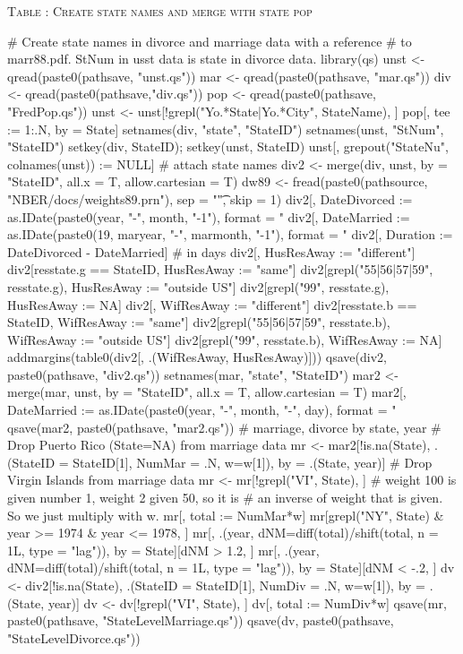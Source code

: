 \begin{appendix}
\clearpage
\textsc{Table \thetable: Create state names and merge with state pop}
\begin{Schunk}
\begin{Sinput}
# Create state names in divorce and marriage data with a reference 
# to marr88.pdf. \textsf{StNum} in usst data is \textsf{state} in divorce data.
library(qs)
unst <- qread(paste0(pathsave, "unst.qs"))
mar <- qread(paste0(pathsave, "mar.qs"))
div <- qread(paste0(pathsave,"div.qs"))
pop <- qread(paste0(pathsave, "FredPop.qs"))
unst <- unst[!grepl("Yo.*State|Yo.*City", StateName), ]
pop[, tee := 1:.N, by = State]
setnames(div, "state", "StateID")
setnames(unst, "StNum", "StateID")
setkey(div, StateID); setkey(unst, StateID)
unst[, grepout("StateNu", colnames(unst)) := NULL]
# attach state names
div2 <- merge(div, unst, by = "StateID", all.x = T, allow.cartesian = T)
dw89 <- fread(paste0(pathsource, "NBER/docs/weights89.prn"), 
  sep = "\t", skip = 1)
div2[, DateDivorced := 
  as.IDate(paste0(year, "-", month, "-1"), format = "%Y-%m-%d")]
div2[, DateMarried := 
  as.IDate(paste0(19, maryear, "-", marmonth, "-1"), format = "%Y-%m-%d")]
div2[, Duration := DateDivorced - DateMarried] # in days
div2[, HusResAway := "different"]
div2[resstate.g == StateID, HusResAway := "same"]
div2[grepl("55|56|57|59", resstate.g), HusResAway := "outside US"]
div2[grepl("99", resstate.g), HusResAway := NA]
div2[, WifResAway := "different"]
div2[resstate.b == StateID, WifResAway := "same"]
div2[grepl("55|56|57|59", resstate.b), WifResAway := "outside US"]
div2[grepl("99", resstate.b), WifResAway := NA]
addmargins(table0(div2[, .(WifResAway, HusResAway)]))
qsave(div2, paste0(pathsave, "div2.qs"))
setnames(mar, "state", "StateID")
mar2 <- merge(mar, unst, by = "StateID", all.x = T, allow.cartesian = T)
mar2[, DateMarried := 
  as.IDate(paste0(year, "-", month, "-", day), format = "%Y-%m-%d")]
qsave(mar2, paste0(pathsave, "mar2.qs"))
# marriage, divorce by state, year
# Drop Puerto Rico (State=NA) from marriage data
mr <- mar2[!is.na(State), 
  .(StateID = StateID[1], NumMar = .N, w=w[1]), by = .(State, year)]
# Drop Virgin Islands from marriage data
mr <- mr[!grepl("VI", State), ]
# weight 100 is given number 1, weight 2 given 50, so it is 
# an inverse of weight that is given. So we just multiply with w.
mr[, total := NumMar*w]
mr[grepl("NY", State) & year >= 1974 & year <= 1978, ]
mr[, .(year, dNM=diff(total)/shift(total, n = 1L, type = "lag")), 
  by = State][dNM > 1.2, ]
mr[, .(year, dNM=diff(total)/shift(total, n = 1L, type = "lag")), 
  by = State][dNM < -.2, ]
dv <- div2[!is.na(State), .(StateID = StateID[1], NumDiv = .N, w=w[1]), 
  by = .(State, year)]
dv <- dv[!grepl("VI", State), ]
dv[, total := NumDiv*w]
qsave(mr, paste0(pathsave, "StateLevelMarriage.qs"))
qsave(dv, paste0(pathsave, "StateLevelDivorce.qs"))
\end{Sinput}
\end{Schunk}

\end{appendix}




